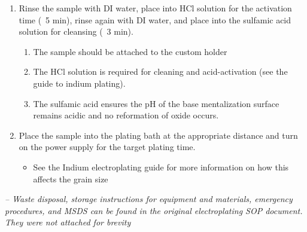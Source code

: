 \begin{tcolorbox}
\begin{enumerate}
        \item Rinse the sample with DI water, place into HCl solution for the activation time (~5 min), rinse again with DI water, and place into the sulfamic acid solution for cleansing (~3 min).
        \begin{enumerate}
            \item The sample should be attached to the custom holder
            \item The HCl solution is required for cleaning and acid-activation (see the guide to indium plating).
            \item The sulfamic acid ensures the pH of the base mentalization surface remains acidic and no reformation of oxide occurs.
        \end{enumerate}

        \item Place the sample into the plating bath at the appropriate distance and turn on the power supply for the target plating time.
        \begin{itemize}
            \item See the Indium electroplating guide for more information on how this affects the grain size
        \end{itemize}
    \end{enumerate}

    \vspace{0.5cm} %

    \textit{-- Waste disposal, storage instructions for equipment and materials, emergency procedures, and MSDS can be found in the original electroplating SOP document. They were not attached for brevity }

\end{tcolorbox}
